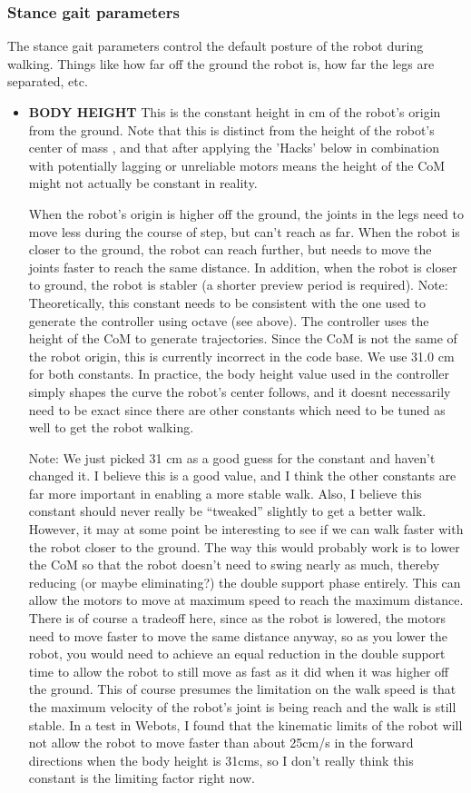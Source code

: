 \documentclass[11pt]{article}
\begin{document}
\subsubsection{Stance gait parameters}
The stance gait parameters control the default posture of the robot during
walking. Things like how far off the ground the robot is, how far the
legs are separated, etc.
\begin{itemize}
\item {\bf BODY HEIGHT} This is the constant height in cm of the
robot's origin from the
ground. Note that this is distinct from the height of the robot's center of mass
, and that after applying the 'Hacks' below in combination with potentially
lagging or unreliable motors means the height of the CoM might not actually be
constant in reality.

When the robot's origin is higher off the ground, the
joints in the legs need to move less during the course of step, but can't reach
as far. When the robot is closer to the ground, the robot can reach further,
but needs to move the joints faster to reach the same distance. In addition,
when the robot is closer to ground, the robot is stabler (a shorter preview
period is required).  Note: Theoretically, this constant needs to be consistent
with the one used to generate the controller using octave (see above). The
controller uses the height of the CoM to generate trajectories. Since the CoM
is not the same of the robot origin, this is currently incorrect in the code
base.  We use 31.0 cm for both constants.  In practice, the body height
value used in the controller simply shapes the curve the robot's center
follows, and it doesnt necessarily need to be exact since there are other
constants which need to be tuned as well to get the robot walking.


Note: We just picked 31 cm as a good guess for the constant and haven't changed
it. I believe this is a good value, and I think the other constants are far
more important in enabling a more stable walk. Also, I believe this constant
should never really be ``tweaked'' slightly to get a better walk.  However,
it may at some point be interesting to see if we can walk faster with the robot
closer to the ground.  The way this would probably work is to lower the CoM
so that the robot doesn't need to swing nearly as much, thereby reducing
(or maybe eliminating?) the double support phase entirely. This can allow
the motors to move at maximum speed to reach the maximum distance. There is of
course a tradeoff here, since as the robot is lowered, the motors need to move
faster to move the same distance anyway, so as you lower the robot, you would
need to achieve an equal reduction in the double support time to allow the
robot to still move as fast as it did when it was higher off the ground. This
of course presumes the limitation on the walk speed is that the maximum
velocity of the robot's joint is being reach and the walk is still stable. In
a test in Webots, I found that the kinematic limits of the robot will not allow
the robot to move faster than about 25cm/s in the forward directions when
the body height is 31cms, so I don't really think this constant is the limiting
factor right now.


\end{itemize}
\end{document}
